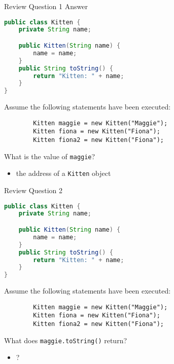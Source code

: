 \documentclass{beamer}
\begin{document}
\begin{frame}[fragile]{Review Question 1 Answer}
\vspace{-.05in}
\begin{lstlisting}[language=Java]
public class Kitten {
    private String name;

    public Kitten(String name) {
        name = name;
    }
    public String toString() {
        return "Kitten: " + name;
    }
}
\end{lstlisting}
\vspace{-.05in}
Assume the following statements have been executed:
\vspace{-.05in}
\begin{lstlisting}
        Kitten maggie = new Kitten("Maggie");
        Kitten fiona = new Kitten("Fiona");
        Kitten fiona2 = new Kitten("Fiona");
\end{lstlisting}
\vspace{-.05in}
What is the value of {\tt maggie}?
\begin{itemize}
\itemsep0em
\item the address of a {\tt Kitten} object
\end{itemize}
\end{frame}

\begin{frame}[fragile]{Review Question 2}
\vspace{-.05in}
\begin{lstlisting}[language=Java]
public class Kitten {
    private String name;

    public Kitten(String name) {
        name = name;
    }
    public String toString() {
        return "Kitten: " + name;
    }
}
\end{lstlisting}
\vspace{-.05in}
Assume the following statements have been executed:
\vspace{-.05in}
\begin{lstlisting}
        Kitten maggie = new Kitten("Maggie");
        Kitten fiona = new Kitten("Fiona");
        Kitten fiona2 = new Kitten("Fiona");
\end{lstlisting}
\vspace{-.05in}
What does {\tt maggie.toString()} return?
\begin{itemize}
\itemsep0em
\item ?
\end{itemize}
\end{frame}
\end{document}
